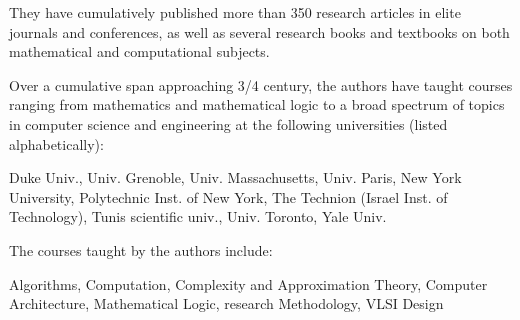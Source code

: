 \documentclass{article}[12pt]
\begin{document}
\smallskip

\noindent
They have cumulatively published more than 350 research articles in elite journals and conferences, as well as several research books and textbooks on both mathematical and computational subjects.

\bigskip

\noindent
Over a cumulative span approaching 3/4 century, the authors have taught courses ranging from mathematics and mathematical logic to a broad spectrum of topics in computer science and engineering at the following universities (listed alphabetically):

\smallskip

\noindent
Duke Univ., 
Univ. Grenoble,
Univ. Massachusetts,
Univ. Paris,
New York University,
Polytechnic Inst. of New York,
The Technion (Israel Inst. of Technology),
Tunis scientific univ.,
Univ. Toronto,
Yale Univ.
\smallskip

\noindent
The courses taught by the authors include:
\smallskip

\noindent
Algorithms,
Computation, Complexity and Approximation Theory,
Computer Architecture,
Mathematical Logic,
research Methodology,
VLSI Design
\end{document}
